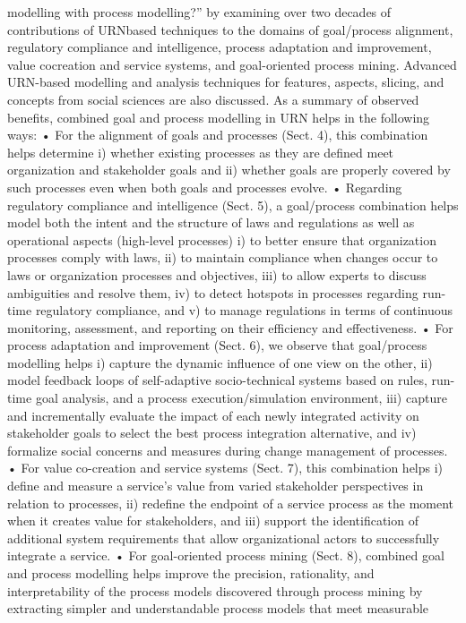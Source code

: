 modelling with process modelling?” by examining over two decades of contributions of URNbased techniques to the domains of goal/process
alignment, regulatory compliance and intelligence,
process adaptation and improvement, value cocreation and service systems, and goal-oriented
process mining. Advanced URN-based modelling
and analysis techniques for features, aspects, slicing, and concepts from social sciences are also
discussed.
As a summary of observed benefits, combined
goal and process modelling in URN helps in the
following ways:
• For the alignment of goals and processes
(Sect. 4), this combination helps determine
i) whether existing processes as they are defined meet organization and stakeholder goals
and ii) whether goals are properly covered by
such processes even when both goals and processes evolve.
• Regarding regulatory compliance and intelligence (Sect. 5), a goal/process combination
helps model both the intent and the structure
of laws and regulations as well as operational
aspects (high-level processes) i) to better ensure
that organization processes comply with laws,
ii) to maintain compliance when changes occur
to laws or organization processes and objectives,
iii) to allow experts to discuss ambiguities and
resolve them, iv) to detect hotspots in processes
regarding run-time regulatory compliance, and
v) to manage regulations in terms of continuous
monitoring, assessment, and reporting on their
efficiency and effectiveness.
• For process adaptation and improvement
(Sect. 6), we observe that goal/process modelling helps i) capture the dynamic influence of
one view on the other, ii) model feedback loops
of self-adaptive socio-technical systems based
on rules, run-time goal analysis, and a process
execution/simulation environment, iii) capture
and incrementally evaluate the impact of each
newly integrated activity on stakeholder goals
to select the best process integration alternative,
and iv) formalize social concerns and measures
during change management of processes.
• For value co-creation and service systems
(Sect. 7), this combination helps i) define and
measure a service’s value from varied stakeholder perspectives in relation to processes,
ii) redefine the endpoint of a service process
as the moment when it creates value for stakeholders, and iii) support the identification of
additional system requirements that allow organizational actors to successfully integrate a
service.
• For goal-oriented process mining (Sect. 8), combined goal and process modelling helps improve
the precision, rationality, and interpretability
of the process models discovered through process mining by extracting simpler and understandable process models that meet measurable
